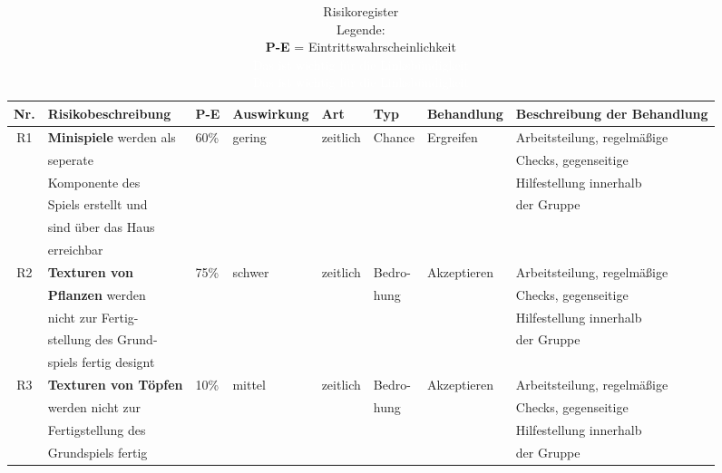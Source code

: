 \label{ch:anhang}
\footnotesize

\begin{table}[H]
    \footnotesize
    \caption[Risikoregister]{Risikoregister \\ Legende: \\
            \textbf{P-E} = Eintrittswahrscheinlichkeit \\
            \tiny\textcolor{white}{Das ist wichtig für die Linksbündigkeit}\\
            \textcolor{white}{Das ist wichtig für die Linksbündigkeit}\\
            }
    \label{tab:risk}
    \footnotesize
    \begin{tabular}{|c|l|l|l|l|l|l|l|}
        \hline
        Nr. & Risikobeschreibung & P-E & Auswirkung & Art & Typ & Behandlung & Beschreibung der Behandlung \\[0.5ex]
        \hline \hline
        R1 & \textbf{Minispiele} werden als & 60\% & gering & zeitlich & Chance & Ergreifen & Arbeitsteilung, regelmäßige\\
        & seperate &  &  &  &  && Checks, gegenseitige  \\
        & Komponente des &  &  & & &  & Hilfestellung innerhalb \\
        & Spiels erstellt und &  &&  &  &  & der Gruppe \\
        & sind über das Haus &  &  &  & & &  \\
        & erreichbar &  &  &  &  &&  \\
        \hline
        R2 & \textbf{Texturen von} & 75\% & schwer & zeitlich & Bedro- & Akzeptieren & Arbeitsteilung, regelmäßige \\
        & \textbf{Pflanzen} werden &  &&  & hung &  & Checks, gegenseitige  \\
        & nicht zur Fertig- &  &  &  & & & Hilfestellung innerhalb \\
        & stellung des Grund- &  &  &  &&  & der Gruppe \\
        & spiels fertig designt &  &  &  & & &  \\
        \hline
        R3 & \textbf{Texturen von Töpfen} & 10\% & mittel & zeitlich & Bedro- & Akzeptieren & Arbeitsteilung, regelmäßige \\
        & werden nicht zur &  &  &  &hung&  & Checks, gegenseitige \\
        & Fertigstellung des &  &  & & &  & Hilfestellung innerhalb \\
        & Grundspiels fertig &  &  &  &&  & der Gruppe \\

\end{tabular}
\end{table}
